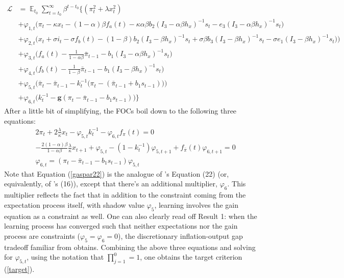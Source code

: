 \documentclass[11pt]{article}
\renewcommand{\[}{\begin{equation}}
\renewcommand{\]}{\end{equation}}
\DeclareMathOperator{\E}{\mathbb{E}}
\begin{document}
 \begin{align}
\mathcal{L} &= \E_{t_0}\sum_{t=t_0}^{\infty} \beta^{t-t_0}\bigg\{  (\pi_t^2  + \lambda x_t^2 )  \\
 & + \varphi_{1,t} \bigg(\pi_t - \kappa x_t -(1-\alpha)\beta f_a(t) -\kappa\alpha\beta b_2 (I_3 - \alpha\beta h_x)^{-1}s_t - e_3(I_3 - \alpha\beta h_x)^{-1}s_t \bigg) \label{midsimple_first}\\
 & + \varphi_{2,t} \bigg(x_t + \sigma i_t -\sigma f_b(t)  -  (1-\beta)b_2 (I_3 - \beta h_x)^{-1}s_t + \sigma\beta b_3 (I_3 - \beta h_x)^{-1}s_t -\sigma e_1(I_3 - \beta h_x)^{-1}s_t  \big)\bigg) \\
 & +  \varphi_{3,t}  \bigg(f_a(t) - \frac{1}{1-\alpha\beta}\bar{\pi}_{t-1}  - b_1(I_3 - \alpha\beta h_x)^{-1}s_t  \bigg) \\
 & + \varphi_{4,t}  \bigg(f_b(t) - \frac{1}{1-\beta}\bar{\pi}_{t-1}  - b_1(I_3 - \beta h_x)^{-1}s_t \bigg)  \\
  & + \varphi_{5,t}  \bigg(  \bar{\pi}_{t} - \bar{\pi}_{t-1} - k_t^{-1}\big(\pi_{t} -(\bar{\pi}_{t-1}+b_1 s_{t-1}) \big)   \bigg)  \\
  & + \varphi_{6,t}  \bigg(k_t^{-1} - \mathbf{g}(\pi_t - \bar{\pi}_{t-1}-b_1 s_{t-1})  \bigg)
  \bigg\} \label{midsimple_last}
\end{align}
After a little bit of simplifying, the FOCs boil down to the following three equations:
\begin{align}
& 2\pi_t + 2\frac{\lambda}{\kappa}x_t -\varphi_{5,t} k_t^{-1} - \varphi_{6,t} f_{\pi}(t) = 0 \label{gaspar22}\\
& -\frac{2(1-\alpha)\beta}{1-\alpha\beta}\frac{\lambda}{\kappa}x_{t+1} + \varphi_{5,t} -(1-k_t^{-1})\varphi_{5,t+1} +f_{\bar{\pi}}(t)\varphi_{6,t+1} = 0 \label{gaspar21}\\
& \varphi_{6,t} = (\pi_t - \bar{\pi}_{t-1}-b_1 s_{t-1}) \varphi_{5,t} \label{constraints}
\end{align}
Note that Equation (\ref{gaspar22}) is the analogue of \cite{gaspar2010inflation}'s Equation (22) (or, equivalently, of  \cite{molnar2014optimal}'s (16)), except that there's an additional multiplier, $\varphi_6$. This multiplier reflects the fact that in addition to the constraint coming from the expectation process itself, with shadow value $\varphi_5$, learning involves the gain equation as a constraint as well. One can also clearly read off Result 1: when the learning process has converged such that neither expectations nor the gain process are constraints ($\varphi_5 =\varphi_6 = 0$), the discretionary inflation-output gap tradeoff familiar from \cite{clarida1999science} obtains. Combining the above three equations and solving for $\varphi_{5,t}$, using the notation that $\prod_{j=1}^{0} = 1$, one obtains the target criterion (\ref{target}).
\end{document}
